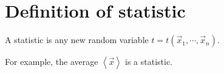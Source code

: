 

\section{Definition of statistic}
\label{sec:def_of_stat}

A statistic is any new random variable $t = t\left( \vec{x}_{1}, \cdots, \vec{x}_{n} \right)$.

For example, the average $\left \langle \vec{x} \right \rangle$ is a statistic.
